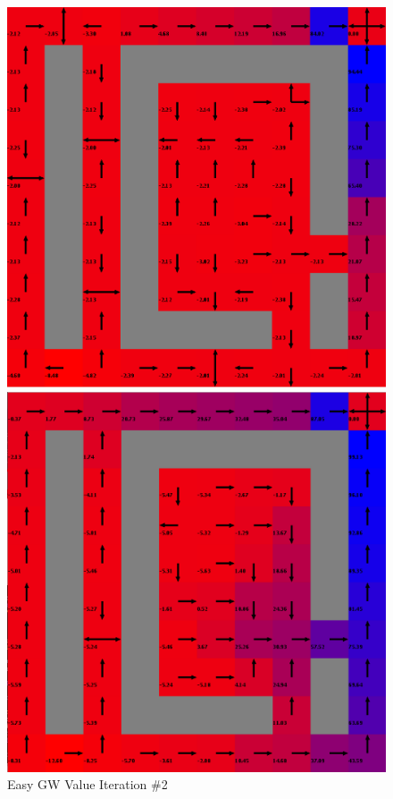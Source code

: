 \documentclass[h]{article}
\begin{document}
 
   \begin{figure}[H]
      \includegraphics[width=1\textwidth,keepaspectratio]{easy-value-2.png} 
      \caption*{Easy GW Value Iteration \#2} 
   \endminipage\hfill
      \includegraphics[width=1\textwidth,keepaspectratio]{easy-value-5.png} 

\end{figure}
\end{document}

